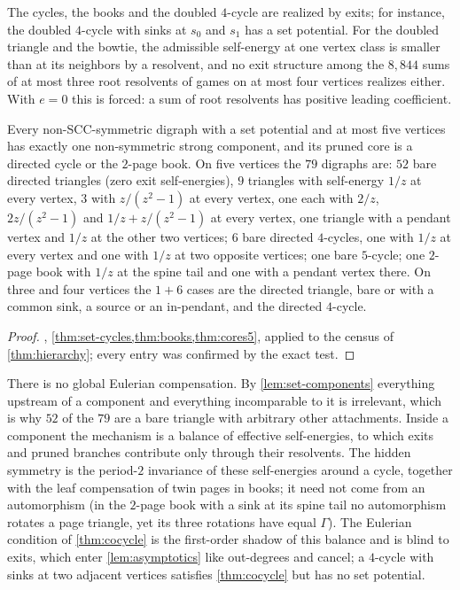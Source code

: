 \documentclass[final]{siamart0516}
\numberwithin{theorem}{section}
\numberwithin{equation}{section}
\theoremstyle{siamnonum}
\theoremstyle{plain}
\begin{document}
The cycles, the books and the doubled $4$-cycle are realized by exits; for instance, the doubled $4$-cycle with sinks at $s_0$ and $s_1$ has a set potential. For the doubled triangle and the bowtie, the admissible self-energy at one vertex class is smaller than at its neighbors by a resolvent, and no exit structure among the $8{,}844$ sums of at most three root resolvents of games on at most four vertices realizes either. With $e=0$ this is forced: a sum of root resolvents has positive leading coefficient.

\begin{corollary}\label{cor:census5}
Every non-SCC-symmetric digraph with a set potential and at most five vertices has exactly one non-symmetric strong component, and its pruned core is a directed cycle or the $2$-page book. On five vertices the $79$ digraphs are: $52$ bare directed triangles (zero exit self-energies), $9$ triangles with self-energy $1/z$ at every vertex, $3$ with $z/(z^2-1)$ at every vertex, one each with $2/z$, $2z/(z^2-1)$ and $1/z+z/(z^2-1)$ at every vertex, one triangle with a pendant vertex and $1/z$ at the other two vertices; $6$ bare directed $4$-cycles, one with $1/z$ at every vertex and one with $1/z$ at two opposite vertices; one bare $5$-cycle; one $2$-page book with $1/z$ at the spine tail and one with a pendant vertex there. On three and four vertices the $1+6$ cases are the directed triangle, bare or with a common sink, a source or an in-pendant, and the directed $4$-cycle.
\end{corollary}
\begin{proof}
, \cref{thm:set-cycles,thm:books,thm:cores5}, applied to the census of \cref{thm:hierarchy}; every entry was confirmed by the exact test.
\end{proof}

\begin{remark}\label{rem:mechanism}
There is no global Eulerian compensation. By \cref{lem:set-components} everything upstream of a component and everything incomparable to it is irrelevant, which is why $52$ of the $79$ are a bare triangle with arbitrary other attachments. Inside a component the mechanism is a balance of effective self-energies, to which exits and pruned branches contribute only through their resolvents. The hidden symmetry is the period-$2$ invariance of these self-energies around a cycle, together with the leaf compensation of twin pages in books; it need not come from an automorphism (in the $2$-page book with a sink at its spine tail no automorphism rotates a page triangle, yet its three rotations have equal $\Gamma$). The Eulerian condition of \cref{thm:cocycle} is the first-order shadow of this balance and is blind to exits, which enter \cref{lem:asymptotics} like out-degrees and cancel; a $4$-cycle with sinks at two adjacent vertices satisfies \cref{thm:cocycle} but has no set potential.
\end{remark}
\end{document}
